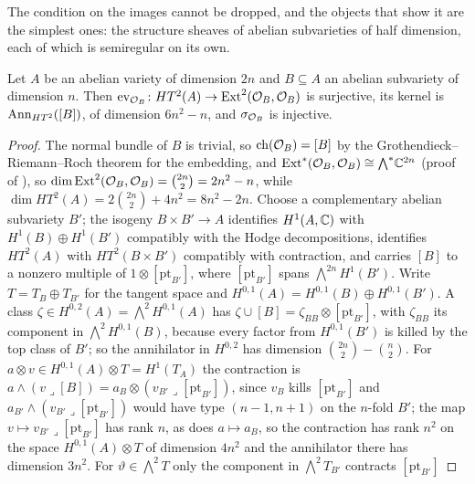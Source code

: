 The condition on the images cannot be dropped, and the objects that show it
are the simplest ones: the structure sheaves of abelian subvarieties of half
dimension, each of which is semiregular on its own.

\begin{lemma}
\label{lem:absemireg}
Let $A$ be an abelian variety of dimension $2n$ and $B\subseteq A$ an abelian
subvariety of dimension $n$. Then $\operatorname{ev}_{\mathcal{O}_{B}}\colon
HT^{2}(A)\to\operatorname{Ext}^{2}(\mathcal{O}_{B},\mathcal{O}_{B})$ is surjective, its kernel is
$\operatorname{Ann}_{HT^{2}}([B])$, of dimension $6n^{2}-n$, and $\sigma_{\mathcal{O}_{B}}$ is
injective.
\end{lemma}

\begin{proof}
The normal bundle of $B$ is trivial, so $\operatorname{ch}(\mathcal{O}_{B})=[B]$ by the
Grothendieck--Riemann--Roch theorem for the embedding, and
$\operatorname{Ext}^{*}(\mathcal{O}_{B},\mathcal{O}_{B})\cong{\textstyle\bigwedge^{*}}\mathbb{C}^{2n}$ (proof of
), so $\dim\operatorname{Ext}^{2}(\mathcal{O}_{B},\mathcal{O}_{B})=\binom{2n}{2}
=2n^{2}-n$, while $\dim HT^{2}(A)=2\binom{2n}{2}+4n^{2}=8n^{2}-2n$. Choose a
complementary abelian subvariety $B'$; the isogeny $B\times B'\to A$
identifies $H^{1}(A,\mathbb{C})$ with $H^{1}(B)\oplus H^{1}(B')$ compatibly with the
Hodge decompositions, identifies $HT^{2}(A)$ with $HT^{2}(B\times B')$
compatibly with contraction, and carries $[B]$ to a nonzero multiple of
$1\otimes[\mathrm{pt}_{B'}]$, where $[\mathrm{pt}_{B'}]$ spans
${\textstyle\bigwedge^{2n}}H^{1}(B')$. Write $T=T_{B}\oplus T_{B'}$ for the
tangent space and $H^{0,1}(A)=H^{0,1}(B)\oplus H^{0,1}(B')$. A class
$\zeta\in H^{0,2}(A)={\textstyle\bigwedge^{2}}H^{0,1}(A)$ has
$\zeta\cup[B]=\zeta_{BB}\otimes[\mathrm{pt}_{B'}]$, with $\zeta_{BB}$ its
component in ${\textstyle\bigwedge^{2}}H^{0,1}(B)$, because every factor from
$H^{0,1}(B')$ is killed by the top class of $B'$; so the annihilator in
$H^{0,2}$ has dimension $\binom{2n}{2}-\binom{n}{2}$. For $a\otimes v\in
H^{0,1}(A)\otimes T=H^{1}(T_{A})$ the contraction is $a\wedge(v\lrcorner[B])
=a_{B}\otimes(v_{B'}\lrcorner[\mathrm{pt}_{B'}])$, since $v_{B}$ kills
$[\mathrm{pt}_{B'}]$ and $a_{B'}\wedge(v_{B'}\lrcorner[\mathrm{pt}_{B'}])$
would have type $(n-1,n+1)$ on the $n$-fold $B'$; the map
$v\mapsto v_{B'}\lrcorner[\mathrm{pt}_{B'}]$ has rank $n$, as does
$a\mapsto a_{B}$, so the contraction has rank $n^{2}$ on the space
$H^{0,1}(A)\otimes T$ of dimension $4n^{2}$ and the annihilator there has
dimension $3n^{2}$. For $\vartheta\in{\textstyle\bigwedge^{2}}T$ only the
component in ${\textstyle\bigwedge^{2}}T_{B'}$ contracts $[\mathrm{pt}_{B'}]$

\end{proof}
